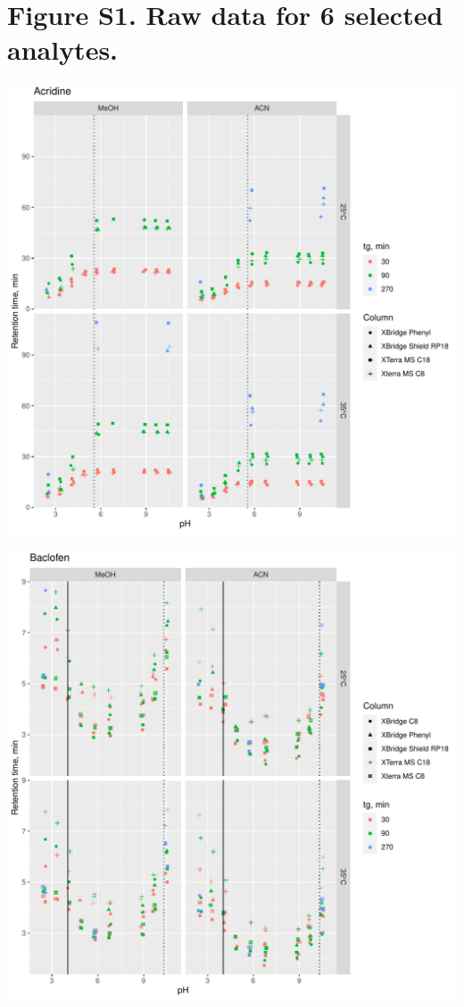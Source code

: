 \documentclass[
]{article}
\begin{document}
\hypertarget{figure-s1.-raw-data-for-6-selected-analytes.}{%
\section{Figure S1. Raw data for 6 selected
analytes.}\label{figure-s1.-raw-data-for-6-selected-analytes.}}

\includegraphics{../figures/rawdata/Acridine.pdf}

\newpage{}

\includegraphics{../figures/rawdata/Baclofen.pdf}
\end{document}
